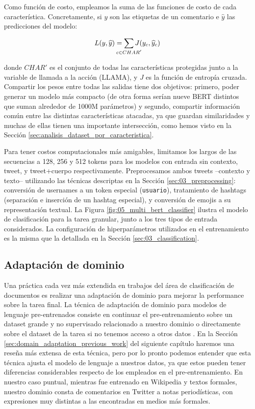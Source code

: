Como función de costo, empleamos la suma de las funciones de costo de cada característica. Concretamente, si $y$ son las etiquetas de un comentario e $\widehat{y}$ las predicciones del modelo:

\begin{equation*}
    L(y, \widehat{y}) = \sum\limits_{\mathclap{c \in CHAR'}} J(y_c, \widehat{y}_c)
\end{equation*}

\noindent donde $CHAR'$ es el conjunto de todas las características protegidas junto a la variable de llamada a la acción (LLAMA), y $ J$ es la función de entropía cruzada. Compartir los pesos entre todas las salidas tiene dos objetivos: primero, poder generar un modelo más compacto (de otra forma serían nueve BERT distintos que suman alrededor de \num{1000}M parámetros) y segundo, compartir información común entre las distintas características atacadas, ya que guardan similaridades y muchas de ellas tienen una importante intersección, como hemos visto en la Sección \ref{sec:analisis_dataset_por_caracteristica}.

Para tener costos computacionales más amigables, limitamos los largos de las secuencias a 128, 256 y 512 tokens para los modelos con entrada sin contexto, tweet, y tweet+cuerpo respectivamente. Preprocesamos ambos tweets --contexto y texto-- utilizando las técnicas descriptas en la Sección \ref{sec:03_preprocessing}: conversión de usernames a un token especial (\verb|usuario|), tratamiento de hashtags (separación e inserción de un hashtag especial), y conversión de emojis a su representación textual. La Figura \ref{fig:05_multi_bert_classifier} ilustra el modelo de clasificación para la tarea granular, junto a los tres tipos de entrada considerados. La configuración de hiperparámetros utilizados en el entrenamiento es la misma que la detallada en la Sección \ref{sec:03_classification}.

\subsection{Adaptación de dominio}
\label{sec:06_domain_adaptation}

Una práctica cada vez más extendida en trabajos del área de clasificación de documentos es realizar una adaptación de dominio para mejorar la performance sobre la tarea final. La técnica de adaptación de dominio para modelos de lenguaje pre-entrenados consiste en continuar el pre-entrenamiento sobre un dataset grande y no supervisado relacionado a nuestro dominio o directamente sobre el dataset de la tarea si no tenemos acceso a otros datos \cite{gururangan-etal-2020-dont}. En la Sección \ref{sec:domain_adaptation_previous_work} del siguiente capítulo haremos una reseña más extensa de esta técnica, pero por lo pronto podemos entender que esta técnica ajusta el modelo de lenguaje a nuestros datos, ya que estos pueden tener diferencias considerables respecto de los empleados en el pre-entrenamiento. En nuestro caso puntual, mientras \beto{} fue entrenado en Wikipedia y textos formales, nuestro dominio consta de comentarios en Twitter a notas periodísticas, con expresiones muy distintas a las encontradas en medios más formales.

